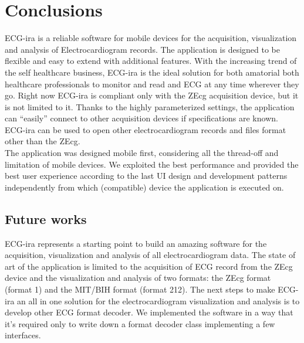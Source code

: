 
\chapter{Conclusions}
\label{Chapter11}

ECG-ira is a reliable software for mobile devices for the acquisition, visualization and analysis of Electrocardiogram records. The application is designed to be flexible and easy to extend with additional features. With the increasing trend of the self healthcare business, ECG-ira is the ideal solution for both amatorial both healthcare professionals to monitor and read and ECG at any time wherever they go. Right now ECG-ira is compliant only with the ZEcg acquisition device, but it is not limited to it. Thanks to the highly parameterized settings, the application can “easily” connect to other acquisition devices if specifications are known. ECG-ira can be used to open other electrocardiogram records and files format other than the ZEcg.\\
The application was designed mobile first, considering all the thread-off and limitation of mobile devices. We exploited the best performance and provided the best user experience according to the last UI design and development patterns independently from which (compatible) device the application is executed on.

\section{Future works}
ECG-ira represents a starting point to build an amazing software for the acquisition, visualization and analysis of all electrocardiogram data. The state of art of the application is limited to the acquisition of ECG record from the ZEcg device and the visualization and analysis of two formats: the ZEcg format (format 1) and the MIT/BIH format (format 212). The next  steps to make ECG-ira an all in one solution for the electrocardiogram visualization and analysis is to develop other ECG format decoder. We implemented the software in a way that it’s required only to write down a format decoder class implementing a few interfaces.


